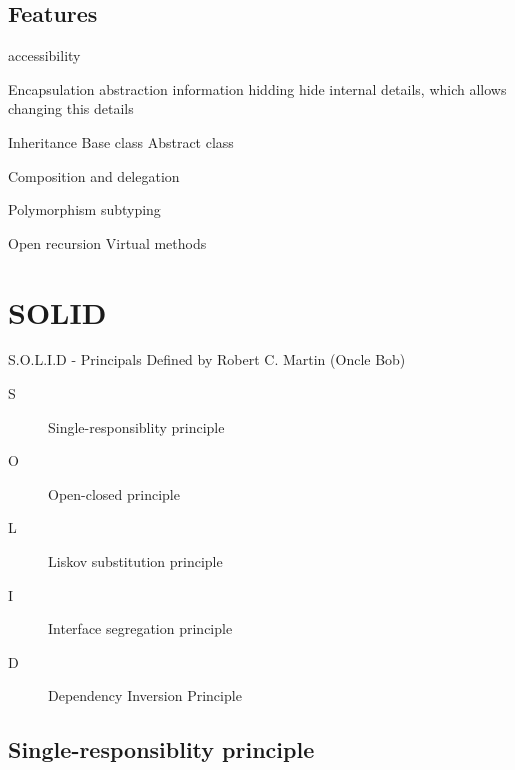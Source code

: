 \documentclass{beamer}
\begin{document}
\subsection{Features}

\begin{frame}
accessibility
\end{frame}

\begin{frame}{Encapsulation}
abstraction
information hidding
hide internal details, which allows changing this details
\end{frame}

\begin{frame}{Inheritance}
Base class
Abstract class
\end{frame}

\begin{frame}{Composition and delegation}
\end{frame}

\begin{frame}{Polymorphism}
subtyping
\end{frame}

\begin{frame}{Open recursion}
Virtual methods




\end{frame}


\section{SOLID}

\begin{frame}{S.O.L.I.D - Principals}
Defined by Robert C. Martin (Oncle Bob)

\begin{description}
\item [S] Single-responsiblity principle
\item [O] Open-closed principle
\item [L] Liskov substitution principle
\item [I] Interface segregation principle
\item [D] Dependency Inversion Principle
\end{description}
\end{frame}

\subsection{Single-responsiblity principle}
\end{document}

